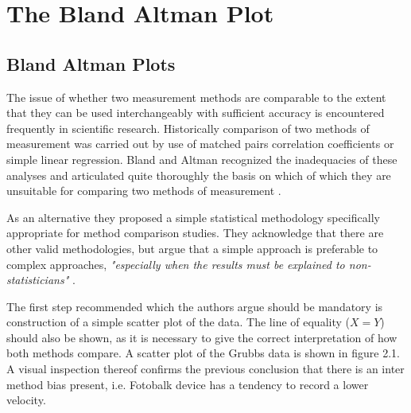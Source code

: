 \documentclass[12pt, a4paper]{report}
\begin{document}
\chapter{The Bland Altman Plot}
\section{Bland Altman Plots}
The issue of whether two measurement methods are comparable to the extent that they can be used interchangeably with sufficient
accuracy is encountered frequently in scientific research. Historically comparison of two methods of measurement was carried
out by use of matched pairs correlation coefficients or simple linear regression. Bland and Altman recognized the inadequacies of
these analyses and articulated quite thoroughly the basis on which of which they are unsuitable for comparing two methods of
measurement \citep*{BA83}.

As an alternative they proposed a simple statistical methodology specifically appropriate for method comparison studies. They
acknowledge that there are other valid methodologies, but argue that a simple approach is preferable to complex approaches,
\emph{"especially when the results must be explained to non-statisticians"} \citep*{BA83}.

The first step recommended which the authors argue should be mandatory is construction of a simple scatter plot of the data.
The line of equality ($X=Y$) should also be shown, as it is necessary to give the correct interpretation of how both methods
compare. A scatter plot of the Grubbs data is shown in figure 2.1. A visual inspection thereof confirms the previous conclusion that
there is an inter method bias present, i.e. Fotobalk device has a tendency to record a lower velocity.
\end{document}
